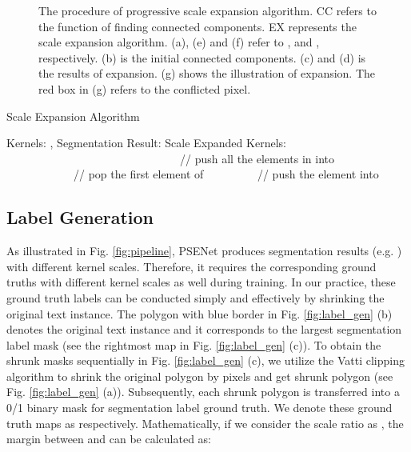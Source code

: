 \documentclass{article}
\begin{document}
\begin{figure}
  \centering
  \setlength{\fboxrule}{0pt}
  \vspace{-14pt}
  \caption{The procedure of progressive scale expansion algorithm. CC refers to the function of finding connected components. EX represents the scale expansion algorithm. (a), (e) and (f) refer to ,  and , respectively. (b) is the initial connected components. (c) and (d) is the results of expansion. (g) shows the illustration of expansion. The red box in (g) refers to the conflicted pixel.}
  \label{fig:pse}
    \vspace{-4pt}
\end{figure}

\begin{algorithm}[t]
	\scriptsize
    \caption{Scale Expansion Algorithm}
    \begin{algorithmic}[1]
        \Require Kernels: , Segmentation Result: 
        \Ensure Scale Expanded Kernels: 
            \State 
{}
           		\State 
           		\State  \ \ \ \ \ \ \ \ \ \ \ \ \ \ \ \ \ \ \ \ \ \ \ \ \ \ \ \ \ \ \ // push all the elements in  into 
\EndFor
            \While{}
                \State    \ \ \ \ \ \ \ \ \ \ \ \ // pop the first element of 
                	\State 
                	\State  \ \ \ \ \ \ \ \ \ // push the element  into 
                \EndIf
\EndWhile
            \State 
            \State \Return{}
        \EndFunction
    \end{algorithmic}
    \label{alg:expansion}
\end{algorithm}
\subsection{Label Generation}
\label{sec:label-gen}
As illustrated in Fig. \ref{fig:pipeline}, PSENet produces segmentation results (e.g. ) with different kernel scales. Therefore, it requires the corresponding ground truths with different kernel scales as well during training. In our practice, these ground truth labels can be conducted simply and effectively by shrinking the original text instance.
The polygon with blue border in Fig. \ref{fig:label_gen} (b) denotes the original text instance and it corresponds to the largest segmentation label mask (see the rightmost map in Fig. \ref{fig:label_gen} (c)). To obtain the shrunk masks sequentially in Fig. \ref{fig:label_gen} (c), we utilize the Vatti clipping algorithm \cite{vatti1992generic} to shrink the original polygon  by  pixels and get shrunk polygon  (see Fig. \ref{fig:label_gen} (a)). Subsequently, each shrunk polygon  is transferred into a 0/1 binary mask for segmentation label ground truth. We denote these ground truth maps as  respectively. Mathematically, if we consider the scale ratio as , the margin  between  and  can be calculated as:
\end{document}
